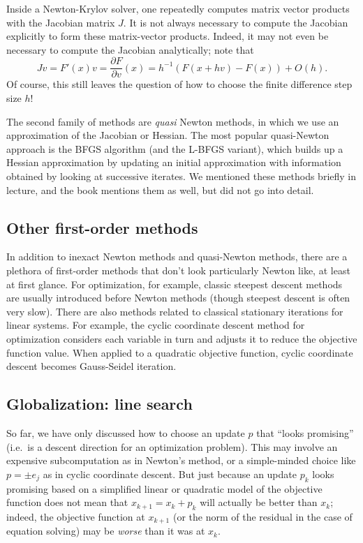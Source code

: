\documentclass[12pt, leqno]{article}
\begin{document}
Inside a Newton-Krylov solver, one repeatedly computes matrix
vector products with the Jacobian matrix $J$.  It is not always
necessary to compute the Jacobian explicitly to form these
matrix-vector products.  Indeed, it may not even be necessary to
compute the Jacobian analytically; note that
\[
  J v = F'(x) v = \frac{\partial F}{\partial v}(x)
  = h^{-1} (F(x+hv)-F(x)) + O(h).
\]
Of course, this still leaves the question of
how to choose the finite difference step size $h$!

The second family of methods are {\em quasi} Newton methods,
in which we use an approximation of the Jacobian or Hessian.
The most popular quasi-Newton approach is the BFGS algorithm
(and the L-BFGS variant), which builds up a Hessian approximation
by updating an initial approximation with information obtained
by looking at successive iterates.  We mentioned these methods
briefly in lecture, and the book mentions them as well,
but did not go into detail.

\subsection{Other first-order methods}

In addition to inexact Newton methods and quasi-Newton methods, there
are a plethora of first-order methods that don't look particularly
Newton like, at least at first glance.  For optimization, for example,
classic steepest descent methods are usually introduced before Newton
methods (though steepest descent is often very slow).  There are also
methods related to classical stationary iterations for linear systems.
For example, the cyclic coordinate descent method for optimization
considers each variable in turn and adjusts it to reduce the objective
function value.  When applied to a quadratic objective function,
cyclic coordinate descent becomes Gauss-Seidel iteration.

\subsection{Globalization: line search}

So far, we have only discussed how to choose an update $p$
that ``looks promising'' (i.e.~is a descent direction for an
optimization problem).  This may involve an expensive subcomputation
as in Newton's method, or a simple-minded choice like $p = \pm e_j$
as in cyclic coordinate descent.  But just because an update $p_k$
looks promising based on a simplified linear or quadratic model of
the objective function does not mean that $x_{k+1} = x_k + p_k$ will
actually be better than $x_k$; indeed, the objective function at
$x_{k+1}$ (or the norm of the residual in the case of equation
solving) may be {\em worse} than it was at $x_k$.
\end{document}
